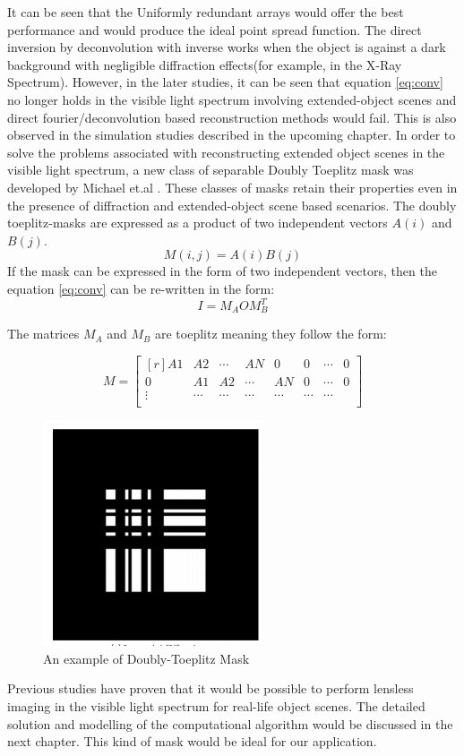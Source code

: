 It can be seen that the Uniformly redundant arrays would offer the best performance and would produce the ideal point spread function. The direct inversion by deconvolution with inverse works when the object is against a dark background with negligible diffraction effects(for example, in the X-Ray Spectrum). 
However, in the later studies\cite{Toeplitz}, it can be seen that equation \ref{eq:conv} no longer holds in the visible light spectrum involving extended-object scenes and direct fourier/deconvolution based reconstruction methods would fail. This is also observed in the simulation studies described in the upcoming chapter. In order to solve the problems associated with reconstructing extended object scenes in the visible light spectrum, a new class of separable Doubly Toeplitz mask was developed by Michael et.al \cite{Toeplitz}. These classes of masks retain their properties even in the presence of diffraction and extended-object scene based scenarios. The doubly toeplitz-masks are expressed as a product of two independent vectors $A(i)$ and $B(j)$.
\begin{equation}
M(i,j) = A(i)B(j)
\end{equation}
If the mask can be expressed in the form of two independent vectors, then the equation \ref{eq:conv} can be re-written in the form: 
\begin{equation}
I = M_AOM_B^T
\label{eq:separable}
\end{equation}

The matrices $M_A$ and $M_B$ are toeplitz meaning they follow the form:

\[ %
 M = 
 \begin{bmatrix*}[r]
    A1 & A2 & \cdots &AN & 0 &0 & \cdots & 0 \\
    0 & A1 & A2 & \cdots &AN & 0 & \cdots & 0\\
    \vdots &\cdots &\cdots &\cdots &\cdots&\cdots&\cdots \\
  \end{bmatrix*}
\]

\begin{figure}[ht]
\centering
\includegraphics[scale = 0.50]{pics/doubly-topelitz}
\caption{An example of Doubly-Toeplitz Mask\cite{Toeplitz}}
\label{fig:doubly_toeplitz}
\end{figure}

Previous studies\cite{Toeplitz}\cite{VBoomi}\cite{Flatcam} have proven that it would be possible to perform lensless imaging  in the visible light spectrum for real-life object scenes. The detailed solution and modelling of the computational algorithm would be discussed in the next chapter. This kind of mask would be ideal for our application.